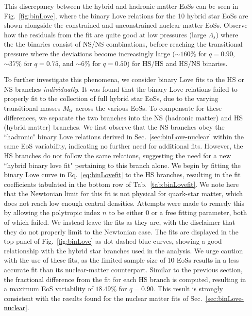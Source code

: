 \documentclass[prd,twocolumn,nofootinbib,superscriptaddress,amsmath,amssymb]{revtex4-1}
\begin{document}
This discrepancy between the hybrid and hadronic matter EoSs can be seen in Fig.~\ref{fig:binLove}, where the binary Love relations for the 10 hybrid star EoSs are shown alongside the constrained and unconstrained nuclear matter EoSs.
Observe how the residuals from the fit are quite good at low pressures (large $\Lambda_s$) where the the binaries consist of NS/NS combinations, before reaching the transitional pressure where the deviations become increasingly large ($\sim160$\% for $q=0.90$, $\sim37$\% for $q=0.75$, and $\sim6$\% for $q=0.50$) for HS/HS and HS/NS binaries. {}{}

To further investigate this phenomena, we consider binary Love fits to the HS or NS branches \emph{individually}.
It was found that the binary Love relations failed to properly fit to the collection of full hybrid star EoSs, due to the varying transitional masses $M_{\text{tr}}$ across the various EoSs.
To compensate for these differences, we separate the two branches into the NS (hadronic matter) and HS (hybrid matter) branches.
We first observe that the NS branches obey the ``hadronic" binary Love relations derived in Sec.~\ref{sec:binLove-nuclear} within the same EoS variability, indicating no further need for additional fits.
However, the HS branches do not follow the same relations, suggesting the need for a new ``hybrid binary love fit" pertaining to this branch alone.
We begin by fitting the binary Love curve in Eq.~\ref{eq:binLovefit} to the HS branches, resulting in the fit coefficients tabulated in the bottom row of Tab.~\ref{tab:binLovefit}.
We note here that the Newtonian limit for this fit is not physical for quark-star matter, which does not reach low enough central densities.
Attempts were made to remedy this by allowing the polytropic index $n$ to be either $0$ or a free fitting parameter, both of which failed.
We instead leave the fits as they are, with the disclaimer that they do not properly limit to the Newtonian case.
The fits are displayed in the top panel of Fig.~\ref{fig:binLove} as dot-dashed blue curves, showing a good relationship with the hybrid star branches used in the analysis.
We urge caution with the use of these fits, as the limited sample size of 10 EoSs results in a less accurate fit than its nuclear-matter counterpart.
Similar to the previous section, the fractional difference from the fit for each HS branch is computed, resulting in a maximum EoS variability of $18.49$\% for $q=0.90$.
This result is strongly consistent with the results found for the nuclear matter fits of Sec.~\ref{sec:binLove-nuclear}.
\end{document}
